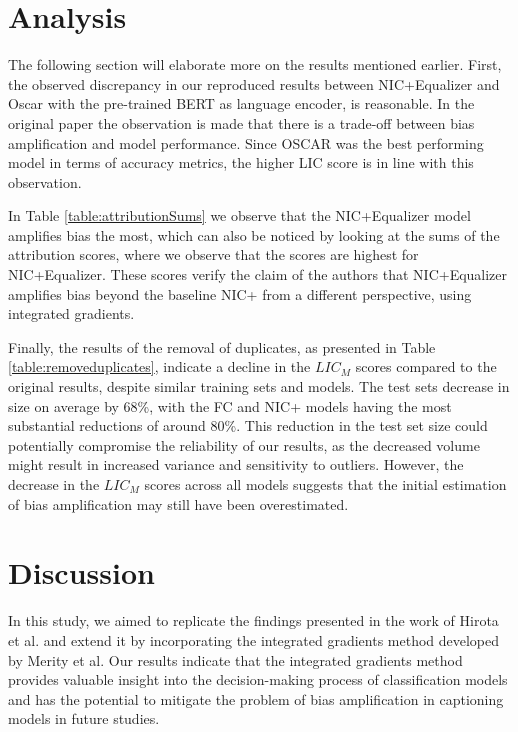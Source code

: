\section{Analysis}
The following section will elaborate more on the results mentioned earlier. First, the observed discrepancy in our reproduced results between NIC+Equalizer and Oscar with the pre-trained BERT as 
language encoder, is reasonable. In the original paper the observation is made that there is a trade-off between bias amplification and model performance.  Since OSCAR was the best performing model in terms of 
accuracy metrics, the higher LIC score is in line with this observation.
\newline

In Table \ref{table:attributionSums} we observe that the NIC+Equalizer model amplifies 
bias the most, which can also be noticed 
by looking at the sums of the attribution scores, where we observe that the scores are highest for NIC+Equalizer. These scores 
verify the claim of the authors that NIC+Equalizer amplifies bias beyond the baseline NIC+ from a different perspective, using 
integrated gradients. \newline

Finally, the results of the removal of duplicates, as presented in Table 
\ref{table:removeduplicates}, indicate a decline in the 
$LIC_M$ scores compared to the original results, despite similar training sets and models. The test sets decrease in size on 
average by 68\%, with the FC and NIC+ models having the most substantial reductions of around 80\%. This reduction in the test 
set size could potentially compromise the reliability of our results, as the decreased volume might result in increased variance 
and sensitivity to outliers. However, the decrease in the $LIC_M$ scores across all models suggests that the initial estimation 
of bias amplification may still have been overestimated.
\newline

\section{Discussion}

In this study, we aimed to replicate the findings presented in the work of Hirota et 
al. and extend it by incorporating the integrated gradients method developed by Merity 
et al. Our results indicate that the integrated gradients method provides valuable 
insight into the decision-making process of classification models and has the potential 
to mitigate the problem of bias amplification in captioning models in future studies. \newline

